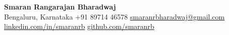 
{\nameSize\headingfont\bfseries\color{navy} Smaran Rangarajan Bharadwaj}\\[\nameGap]
{\small\color{subtext}
Bengaluru, Karnataka \enspace\textbullet\enspace
+91 89714 46578 \enspace\textbullet\enspace
\href{mailto:smaranrbharadwaj@gmail.com}{smaranrbharadwaj@gmail.com} \enspace\textbullet\enspace
\href{https://linkedin.com/in/smaranrb}{linkedin.com/in/smaranrb} \enspace\textbullet\enspace
\href{https://github.com/smaranrb}{github.com/smaranrb}
}
